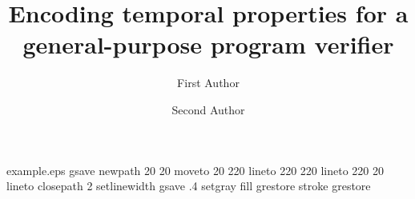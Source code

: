 %
%
%
%
%
\begin{filecontents*}{example.eps}
gsave
newpath
  20 20 moveto
  20 220 lineto
  220 220 lineto
  220 20 lineto
closepath
2 setlinewidth
gsave
  .4 setgray fill
grestore
stroke
grestore
\end{filecontents*}
%
\RequirePackage{fix-cm}
%
\documentclass[smallextended]{svjour3}       %
%
\smartqed  %
%
\usepackage{graphicx}
\usepackage{color}

%
%
%
%
%


\title{Encoding temporal properties for a general-purpose program verifier%
}


\author{First Author         \and
        Second Author %
}


